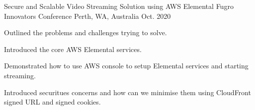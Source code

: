 

\begin{cventries}
  \cventry
    {Secure and Scalable Video Streaming Solution using AWS Elemental} %
    {Fugro Innovators Conference} %
    {Perth, WA, Australia} %
    {Oct. 2020} %
    {
      \begin{cvitems} %
        \item {Outlined the problems and challenges trying to solve.}
        \item {Introduced the core AWS Elemental services.}
        \item {Demonstrated how to use AWS console to setup Elemental services and starting streaming.}
        \item {Introduced securitues concerns and how can we minimise them using CloudFront signed URL and signed cookies.}
      \end{cvitems}
    }
\end{cventries}
